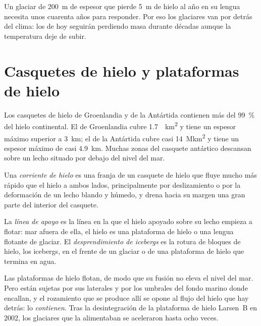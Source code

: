 Un glaciar de \qty{200}{m} de espesor que pierde \qty{5}{m} de hielo al año en su
lengua necesita unos cuarenta años para responder. Por eso los glaciares van por detrás del
clima: los de hoy seguirán perdiendo masa durante décadas aunque la
temperatura deje de subir.

\section{Casquetes de hielo y plataformas de hielo}\label{sec:b3:glaciology:ice-sheets}

Los casquetes de hielo de Groenlandia y de la Antártida contienen más del
\qty{99}{\percent} del hielo continental. El de Groenlandia cubre \qty{1.7}{\mega
km^2} y tiene un espesor máximo superior a \qty{3}{km}; el de la Antártida cubre
casi \qty{14}{\mega km^2} y tiene un espesor máximo de casi \qty{4.9}{km}. Muchas
zonas del casquete antártico descansan sobre un lecho situado por debajo del nivel del mar.

\begin{definition}\label{def:b3:glaciology:ice-stream}
Una \emph{corriente de hielo} es una franja de un casquete de hielo que fluye
mucho más rápido que el hielo a ambos lados, principalmente por deslizamiento o por la
deformación de un lecho blando y húmedo, y drena hacia su margen una gran parte del
interior del casquete.
\end{definition}

\begin{definition}\label{def:b3:glaciology:grounding-line}
La \emph{línea de apoyo} es la línea en la que el hielo
apoyado sobre su lecho empieza a flotar: mar afuera de ella, el hielo es una plataforma de hielo
o una lengua flotante de glaciar. El \emph{desprendimiento de icebergs} es la rotura
de bloques de hielo, los icebergs, en el frente de un glaciar o de una plataforma de hielo
que termina en agua.
\end{definition}

Las plataformas de hielo flotan, de modo que su fusión no eleva el nivel del mar. Pero
están sujetas por sus laterales y por los umbrales del fondo marino donde encallan, y
el rozamiento que se produce allí se opone al flujo del hielo que hay detrás: lo
\emph{contienen}. Tras la desintegración de la plataforma de hielo Larsen~B en 2002, los
glaciares que la alimentaban se aceleraron hasta ocho veces.

